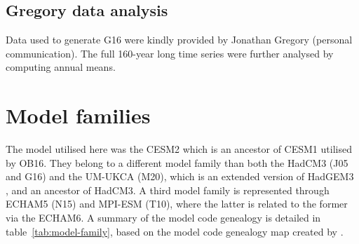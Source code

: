 \documentclass[draft]{agujournal2019}
\begin{document}
\subsection{Gregory data analysis}\label{ap:g16}

Data used to generate G16 were kindly provided by Jonathan Gregory (personal
communication). The full 160-year long time series were further analysed by computing
annual means.

\section{Model families}

The model utilised here was the CESM2 which is an ancestor of CESM1 utilised
by OB16. They belong to a different model family than both the HadCM3 (J05
and G16) and the UM-UKCA (M20), which is an extended version of HadGEM3
\cite{dhomse2014}, and an ancestor of HadCM3. A third model family is represented
through ECHAM5 (N15) and MPI-ESM (T10), where the latter is related to the
former via the ECHAM6. A summary of the model code genealogy is detailed in
table~\ref{tab:model-family}, based on the model code genealogy map created by
.
\end{document}
